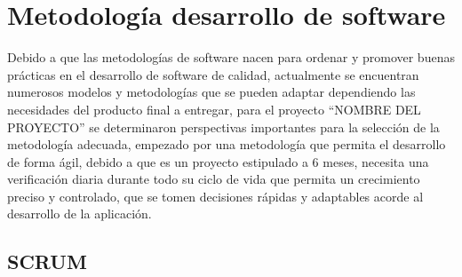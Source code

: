 \section{Metodología desarrollo de software}
Debido a que las metodologías de software nacen para ordenar y promover buenas prácticas en el desarrollo de software de calidad, actualmente se encuentran numerosos modelos y metodologías que se pueden adaptar dependiendo las necesidades del producto final a entregar,\parencite{Nohemy2015ESCOGERDECISION} para el proyecto “NOMBRE DEL PROYECTO” se determinaron perspectivas importantes para la selección de la metodología adecuada, empezado por una metodología que permita el desarrollo de forma ágil, debido a que es un proyecto estipulado a 6 meses, necesita una verificación diaria durante todo su ciclo de vida que permita un crecimiento preciso y controlado, que se tomen decisiones rápidas y adaptables acorde al desarrollo de la aplicación. 

\subsection{SCRUM}


